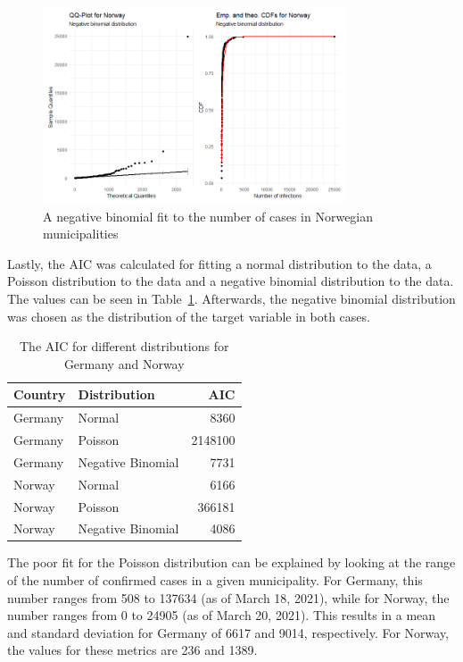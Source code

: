 \begin{figure}[H]
    \centering
    \includegraphics[width = 0.8\textwidth]{fit_nbinom_norway.png}
    \caption{A negative binomial fit to the number of cases in Norwegian municipalities}
    \label{fitNegbinomNorway}
\end{figure}
Lastly, the AIC was calculated for fitting a normal distribution to the data, a Poisson distribution to the data and a negative binomial distribution to the data. The values can be seen in Table~\ref{aic}. Afterwards, the negative binomial distribution was chosen as the distribution of the target variable in both cases. \\
\begin{table}[H] 
\caption{The AIC for different distributions for Germany and Norway \label{aic}}
\begin{tabular}{l l r}
\toprule
\textbf{Country}	& \textbf{Distribution}	& \textbf{AIC} \\
\midrule
Germany & Normal & 8360 \\
Germany & Poisson & 2148100 \\
Germany & Negative Binomial & 7731 \\
Norway & Normal & 6166 \\
Norway & Poisson & 366181 \\
Norway & Negative Binomial & 4086 \\
\bottomrule
\end{tabular}
\end{table} 
The poor fit for the Poisson distribution can be explained by looking at the range of the number of confirmed cases in a given municipality. For Germany, this number ranges from 508 to 137634 (as of March 18, 2021), while for Norway, the number ranges from 0 to 24905 (as of March 20, 2021). This results in a mean and standard deviation for Germany of 6617 and 9014, respectively. For Norway, the values for these metrics are 236 and 1389.
\clearpage
